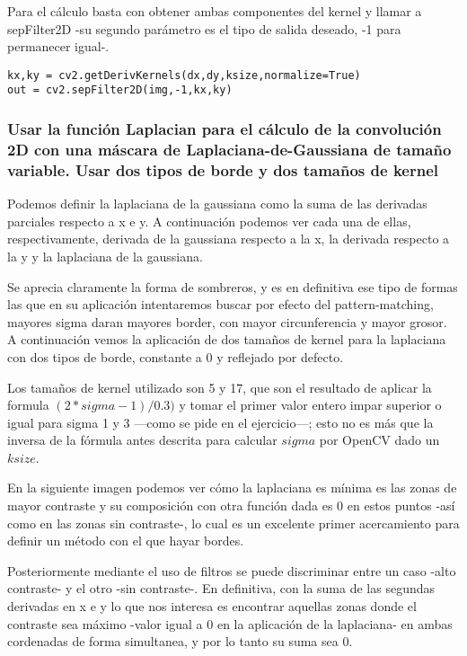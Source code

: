 \documentclass{article}
\newcommand{\img}[2]{
\noindent\makebox[\textwidth][c]{\texttt{[image: \#1]}}%
}
\begin{document}
\img{eximg/ej2_p}{1.2}

Para el cálculo basta con obtener ambas componentes del kernel y llamar a sepFilter2D -su segundo parámetro es el tipo de salida deseado, -1 para permanecer igual-.

\begin{lstlisting}
kx,ky = cv2.getDerivKernels(dx,dy,ksize,normalize=True)
out = cv2.sepFilter2D(img,-1,kx,ky)
\end{lstlisting}


\subsubsection{Usar la función Laplacian para el cálculo de la convolución 2D con una máscara de Laplaciana-de-Gaussiana de tamaño variable. Usar dos tipos de borde y dos tamaños de kernel}

Podemos definir la laplaciana de la gaussiana como la suma de las derivadas parciales respecto a x e y. A continuación podemos ver cada una de ellas, respectivamente, derivada de la gaussiana respecto a la x, la derivada respecto a la y y la laplaciana de la gaussiana.

\img{eximg/ej3_lap}{0.8}

Se aprecia claramente la forma de sombreros, y es en definitiva ese tipo de formas las que en su aplicación intentaremos buscar por efecto del pattern-matching, mayores sigma daran mayores border, con mayor circunferencia y mayor grosor. A continuación vemos la aplicación de dos tamaños de kernel para la laplaciana con dos tipos de borde, constante a 0 y reflejado por defecto.

\img{eximg/ej3}{1}

Los tamaños de kernel utilizado son 5 y 17, que son el resultado de aplicar la formula $(2 * sigma - 1) / 0.3)$ y tomar el primer valor entero impar superior o igual para sigma 1 y 3 ---como se pide en el ejercicio---; esto no es más que la inversa de la fórmula antes descrita para calcular $sigma$ por OpenCV dado un $ksize$.

En la siguiente imagen podemos ver cómo la laplaciana es mínima es las zonas de mayor contraste y su composición con otra función dada es 0 en estos puntos -así como en las zonas sin contraste-, lo cual es un excelente primer acercamiento para definir un método con el que hayar bordes.

\img{eximg/ej3_lcom}{0.7}

Posteriormente mediante el uso de filtros se puede discriminar entre un caso -alto contraste- y el otro -sin contraste-. En definitiva, con la suma de las segundas derivadas en x e y lo que nos interesa es encontrar aquellas zonas donde el contraste sea máximo -valor igual a 0 en la aplicación de la laplaciana- en ambas cordenadas de forma simultanea, y por lo tanto su suma sea 0.
\end{document}
